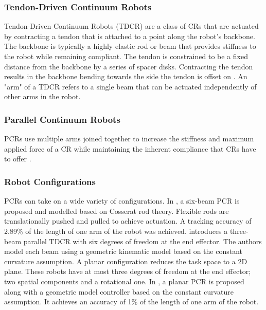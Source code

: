 \subsubsection{Tendon-Driven Continuum Robots}
Tendon-Driven Continuum Robots (TDCR) are a class of CRs that are actuated by contracting a tendon that is attached to a point along the robot's backbone. The backbone is typically a highly elastic rod or beam that provides stiffness to the robot while remaining compliant. The tendon is constrained to be a fixed distance from the backbone by a series of spacer disks. Contracting the tendon results in the backbone bending towards the side the tendon is offset on \cite{HEMAMI198527, 10.3389/frobt.2020.630245}. An "arm" of a TDCR refers to a single beam that can be actuated independently of other arms in the robot. 

\subsubsection{Parallel Continuum Robots}
PCRs use multiple arms joined together to increase the stiffness and maximum applied force of a CR while maintaining the inherent compliance that CRs have to offer \cite{survey}. 

\subsubsection{Robot Configurations}
PCRs can take on a wide variety of configurations. In \cite{6906943}, a six-beam PCR is proposed and modelled based on Cosserat rod theory. Flexible rods are translationally pushed and pulled to achieve actuation. A tracking accuracy of 2.89\% of the length of one arm of the robot was achieved.  \cite{slilge_2020} introduces a three-beam parallel TDCR with six degrees of freedom at the end effector. The authors model each beam using a geometric kinematic model based on the constant curvature assumption. A planar configuration reduces the task space to a 2D plane. These robots have at most three degrees of freedom at the end effector; two spatial components and a rotational one. In \cite{9143427}, a planar PCR is proposed along with a geometric model controller based on the constant curvature assumption. It achieves an accuracy of 1\% of the length of one arm of the robot.  


